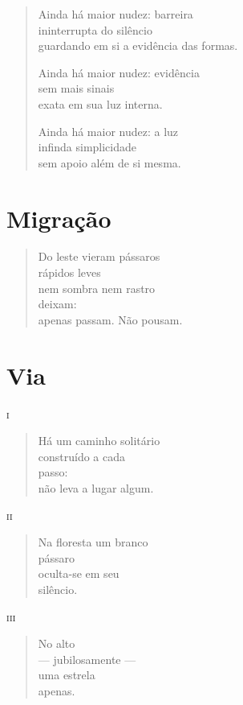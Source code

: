 \begin{verse}
Ainda há maior nudez: barreira\\
ininterrupta do silêncio\\
guardando em si a evidência das formas.

Ainda há maior nudez: evidência\\
sem mais sinais\\
exata em sua luz interna.

Ainda há maior nudez: a luz\\
infinda simplicidade\\
sem apoio além de si mesma.
\end{verse}

\chapter{Migração}

\begin{verse}
Do leste vieram pássaros\\
rápidos leves\\
nem sombra nem rastro\\
deixam:\\
apenas passam. Não pousam.
\end{verse}

\chapter{Via}

\forceindent\textsc{i}

\begin{verse}
Há um caminho solitário\\
construído a cada\\
passo:\\
não leva a lugar algum.
\end{verse}

\medskip
\textsc{ii}

\begin{verse}
Na floresta um branco\\
pássaro\\
oculta-se em seu\\
silêncio.
\end{verse}

\medskip
\textsc{iii}

\begin{verse}
No alto\\
--- jubilosamente ---\\
uma estrela\\
apenas.
\end{verse}

